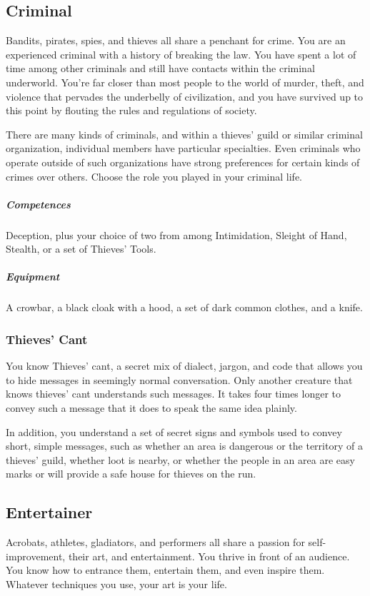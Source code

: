 \newpage

\subsection*{Criminal} \label{ssec::criminal}
    Bandits, pirates, spies, and thieves all share a penchant for crime.
    You are an experienced criminal with a history of breaking the law.
    You have spent a lot of time among other criminals and still have contacts within the criminal underworld.
    You're far closer than most people to the world of murder, theft, and violence that pervades the underbelly of civilization, and you have survived up to this point by flouting the rules and regulations of society.

    There are many kinds of criminals, and within a thieves' guild or similar criminal organization, individual members have particular specialties.
    Even criminals who operate outside of such organizations have strong preferences for certain kinds of crimes over others.
    Choose the role you played in your criminal life.

    \subparagraph{Competences} Deception, plus your choice of two from among Intimidation, Sleight of Hand, Stealth, or a set of Thieves' Tools.

    \subparagraph{Equipment} A crowbar, a black cloak with a hood, a set of dark common clothes, and a knife.

    \subsubsection{Thieves' Cant}
        You know Thieves' cant, a secret mix of dialect, jargon, and code that allows you to hide messages in seemingly normal conversation.
        Only another creature that knows thieves' cant understands such messages.
        It takes four times longer to convey such a message that it does to speak the same idea plainly.

        In addition, you understand a set of secret signs and symbols used to convey short, simple messages, such as whether an area is dangerous or the territory of a thieves' guild, whether loot is nearby, or whether the people in an area are easy marks or will provide a safe house for thieves on the run.

\subsection*{Entertainer} \label{ssec::entertainer}
    Acrobats, athletes, gladiators, and performers all share a passion for self-improvement, their art, and entertainment. %
    You thrive in front of an audience.
    You know how to entrance them, entertain them, and even inspire them.
    Whatever techniques you use, your art is your life.

